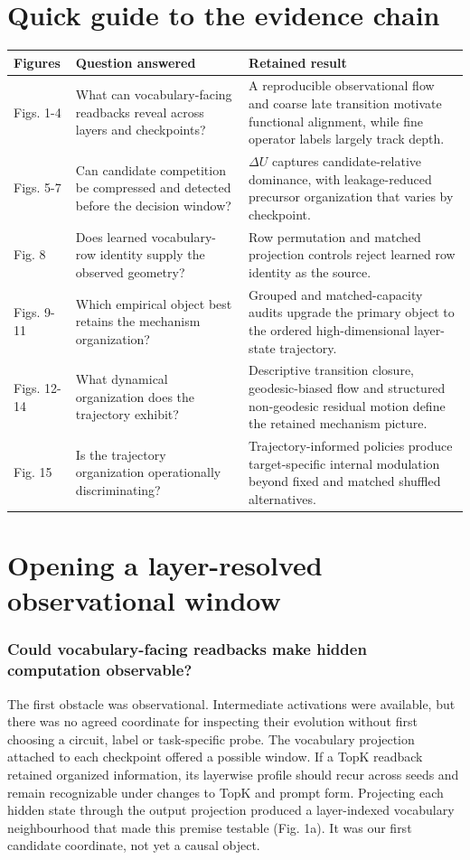\documentclass[11pt]{article}
\begin{document}
\section*{Quick guide to the evidence chain}
\begin{table}[H]
\centering\scriptsize\sloppy
\begin{tabularx}{\textwidth}{@{}XXX@{}}
\toprule
Figures & Question answered & Retained result \\
\midrule
Figs. 1-4 & What can vocabulary-facing readbacks reveal across layers and checkpoints? & A reproducible observational flow and coarse late transition motivate functional alignment, while fine operator labels largely track depth. \\
Figs. 5-7 & Can candidate competition be compressed and detected before the decision window? & \(\Delta U\) captures candidate-relative dominance, with leakage-reduced precursor organization that varies by checkpoint. \\
Fig. 8 & Does learned vocabulary-row identity supply the observed geometry? & Row permutation and matched projection controls reject learned row identity as the source. \\
Figs. 9-11 & Which empirical object best retains the mechanism organization? & Grouped and matched-capacity audits upgrade the primary object to the ordered high-dimensional layer-state trajectory. \\
Figs. 12-14 & What dynamical organization does the trajectory exhibit? & Descriptive transition closure, geodesic-biased flow and structured non-geodesic residual motion define the retained mechanism picture. \\
Fig. 15 & Is the trajectory organization operationally discriminating? & Trajectory-informed policies produce target-specific internal modulation beyond fixed and matched shuffled alternatives. \\
\bottomrule
\end{tabularx}
\end{table}

\section{Opening a layer-resolved observational window}
\subsubsection*{Could vocabulary-facing readbacks make hidden computation observable?}
The first obstacle was observational. Intermediate activations were available, but there was no agreed coordinate for inspecting their evolution without first choosing a circuit, label or task-specific probe. The vocabulary projection attached to each checkpoint offered a possible window. If a TopK readback retained organized information, its layerwise profile should recur across seeds and remain recognizable under changes to TopK and prompt form. Projecting each hidden state through the output projection produced a layer-indexed vocabulary neighbourhood that made this premise testable (Fig. 1a). It was our first candidate coordinate, not yet a causal object.
\end{document}
